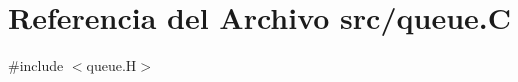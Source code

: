 \hypertarget{queue_8_c}{}\section{Referencia del Archivo src/queue.C}
\label{queue_8_c}
{\ttfamily \#include $<$queue.\+H$>$}\newline
